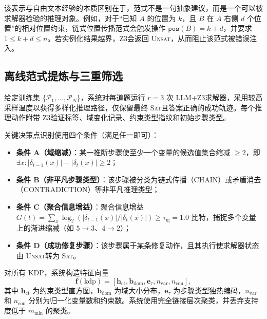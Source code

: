 \documentclass[UTF8,a4paper,12pt]{ctexart}
\newcommand{\sat}{\textsc{Sat}}
\newcommand{\unsat}{\textsc{Unsat}}
\newcommand{\zthree}{Z3}
\begin{document}
该表示与自由文本经验的本质区别在于，范式不是一句抽象建议，而是一个可以被求解器检验的推理对象。例如，对于“已知 \(A\) 的位置为 \(k\)，且 \(B\) 在 \(A\) 右侧 \(d\) 个位置”的相对位置约束，链式位置传播范式会触发操作 \(\texttt{pos}(B)=k+d\)，并要求 \(1\leq k+d\leq n\)。若实例化结果越界，\zthree 会返回 \unsat，从而阻止该范式被错误注入。

\subsection{离线范式提炼与三重筛选}

给定训练集 \(\{\mathcal{P}_1,\ldots,\mathcal{P}_N\}\)，系统对每道题运行 \(r=3\) 次 LLM+\zthree 求解器，采用较高采样温度以获得多样化推理路径，仅保留最终 \sat 且答案正确的成功轨迹。每个推理动作附带 \zthree 验证标签、域变化记录、约束类型指纹和初始步骤类型。

关键决策点识别使用四个条件（满足任一即可）：
\begin{itemize}
  \item \textbf{条件 A（域缩减）}：某一推断步骤使至少一个变量的候选值集合缩减 \(\geq 2\)，即 \(\exists x\colon|\delta_{t-1}(x)|-|\delta_t(x)|\geq 2\)；
  \item \textbf{条件 B（非平凡步骤类型）}：该步骤被分类为链式传播（CHAIN）或矛盾消去（CONTRADICTION）等非平凡推理类型；
  \item \textbf{条件 C（聚合信息增益）}：聚合信息增益 \(G(t)=\sum_x\log_2(|\delta_{t-1}(x)|/|\delta_t(x)|)\geq\tau_{\text{ig}}=1.0\) 比特，捕捉多个变量上的渐进缩减（如 \(5\to3\)、\(4\to2\)）；
  \item \textbf{条件 D（成功修复步骤）}：该步骤属于某条修复动作，且其执行使求解器状态由 \unsat 转为 \sat。
\end{itemize}

对所有 KDP，系统构造特征向量
\begin{equation}
  \mathbf{f}(\text{kdp})=
  [\mathbf{h}_{\text{ct}},\mathbf{b}_{\text{dom}},\mathbf{e}_{\tau},n_{\text{var}},n_{\text{con}}],
\end{equation}
其中 \(\mathbf{h}_{\text{ct}}\) 为约束类型直方图，\(\mathbf{b}_{\text{dom}}\) 为域大小分布，\(\mathbf{e}_{\tau}\) 为步骤类型独热编码，\(n_{\text{var}}\) 和 \(n_{\text{con}}\) 分别为归一化变量数和约束数。系统使用完全链接层次聚类，并丢弃支持度低于 \(m_{\min}\) 的聚类。
\end{document}
